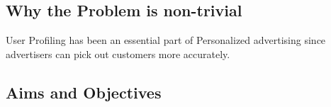 \subsection{Why the Problem is non-trivial}
        User Profiling has been an essential part of Personalized
        advertising since advertisers can pick out customers more
        accurately. 


\subsection{Aims and Objectives}